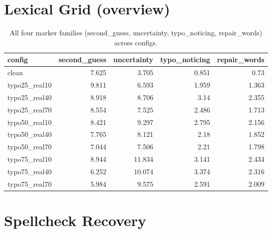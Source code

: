 \documentclass[11pt]{article}
\begin{document}
\section*{Lexical Grid (overview)}
\begin{table}[H]
\centering
\caption{All four marker families (second\_guess, uncertainty, typo\_noticing, repair\_words) across configs.}
\small
\begin{adjustbox}{max width=\textwidth}
\begin{tabular}{lrrrr}
\toprule
\textbf{config} & \textbf{second\_guess} & \textbf{uncertainty} & \textbf{typo\_noticing} & \textbf{repair\_words} \\
\midrule
clean & 7.625 & 3.705 & 0.851 & 0.73 \\
typo25\_real10 & 9.811 & 6.593 & 1.959 & 1.363 \\
typo25\_real40 & 8.918 & 8.706 & 3.14 & 2.355 \\
typo25\_real70 & 8.554 & 7.525 & 2.486 & 1.713 \\
typo50\_real10 & 8.421 & 9.297 & 2.795 & 2.156 \\
typo50\_real40 & 7.765 & 8.121 & 2.18 & 1.852 \\
typo50\_real70 & 7.044 & 7.506 & 2.21 & 1.798 \\
typo75\_real10 & 8.944 & 11.834 & 3.141 & 2.434 \\
typo75\_real40 & 6.252 & 10.074 & 3.374 & 2.316 \\
typo75\_real70 & 5.984 & 9.575 & 2.591 & 2.009 \\
\bottomrule
\end{tabular}
\end{adjustbox}
\end{table}

\section*{Spellcheck Recovery}

\end{document}
